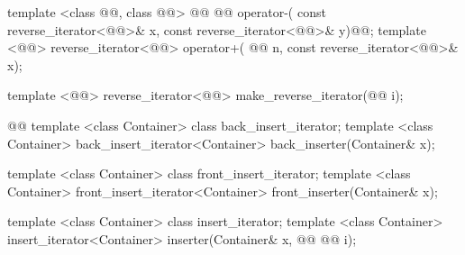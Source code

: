 \begin{codeblock}
  template <class @@, class @@>
      @@
    @@ operator-(
      const reverse_iterator<@@>& x,
      const reverse_iterator<@@>& y)@@;
  template <@@>
    reverse_iterator<@@>
      operator+(
    @@ n,
    const reverse_iterator<@@>& x);

  template <@@>
    reverse_iterator<@@> make_reverse_iterator(@@ i);

  @@
  template <class Container> class back_insert_iterator;
  template <class Container>
    back_insert_iterator<Container> back_inserter(Container& x);

  template <class Container> class front_insert_iterator;
  template <class Container>
    front_insert_iterator<Container> front_inserter(Container& x);

  template <class Container> class insert_iterator;
  template <class Container>
    insert_iterator<Container> inserter(Container& x, @@
      @@ i);


\end{codeblock}
